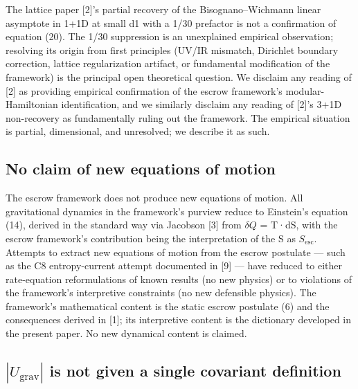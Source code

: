 \documentclass[11pt]{article}
\begin{document}
The lattice paper [2]'s partial recovery of the Bisognano--Wichmann
linear asymptote in 1+1D at small d1 with a 1/30 prefactor is not a
confirmation of equation (20). The 1/30 suppression is an unexplained
empirical observation; resolving its origin from first principles (UV/IR
mismatch, Dirichlet boundary correction, lattice regularization
artifact, or fundamental modification of the framework) is the principal
open theoretical question. We disclaim any reading of [2] as providing
empirical confirmation of the escrow framework's modular-Hamiltonian
identification, and we similarly disclaim any reading of [2]'s 3+1D
non-recovery as fundamentally ruling out the framework. The empirical
situation is partial, dimensional, and unresolved; we describe it as
such.


\subsection{No claim of new equations of motion}

The escrow framework does not produce new equations of motion. All
gravitational dynamics in the framework's purview reduce to Einstein's
equation (14), derived in the standard way via Jacobson [3] from $\delta Q$ =
T·dS, with the escrow framework's contribution being the interpretation
of the S as $S_{\mathrm{esc}}$. Attempts to extract new equations of motion from the
escrow postulate --- such as the C8 entropy-current attempt documented
in [9] --- have reduced to either rate-equation reformulations of
known results (no new physics) or to violations of the framework's
interpretive constraints (no new defensible physics). The framework's
mathematical content is the static escrow postulate (6) and the
consequences derived in [1]; its interpretive content is the
dictionary developed in the present paper. No new dynamical content is
claimed.


\subsection{$|U_{\mathrm{grav}}|$ is not given a single covariant definition}
\end{document}
